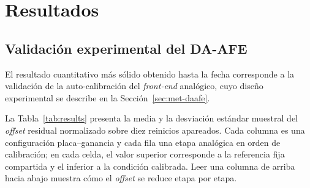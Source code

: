 \section{Resultados}
\label{sec:resultados}

\subsection{Validaci\'on experimental del DA-AFE}

El resultado cuantitativo m\'as s\'olido obtenido hasta la fecha corresponde a la
validaci\'on de la auto-calibraci\'on del \emph{front-end} anal\'ogico, cuyo dise\~no
experimental se describe en la Secci\'on~\ref{sec:met-daafe}.

La Tabla~\ref{tab:results} presenta la media y la desviaci\'on est\'andar muestral del
\emph{offset} residual normalizado sobre diez reinicios apareados. Cada columna es una
configuraci\'on placa--ganancia y cada fila una etapa anal\'ogica en orden de calibraci\'on;
en cada celda, el valor superior corresponde a la referencia fija compartida y el
inferior a la condici\'on calibrada. Leer una columna de arriba hacia abajo muestra c\'omo
el \emph{offset} se reduce etapa por etapa.

